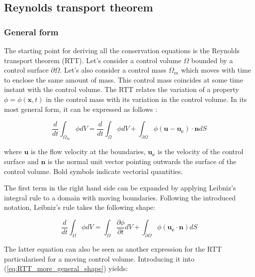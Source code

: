 \subsection{Reynolds transport theorem}

\subsubsection*{General form}

The starting point for deriving all the conservation equations is the Reynolds transport theorem (RTT). Let's consider a control volume $\Omega$ bounded by a control surface $\partial \Omega$. Let's also consider a control mass $\Omega_m$ which moves with time to enclose the same amount of mass. This control mass coincides at some time instant with the control volume. The RTT relates the variation of a property $\phi = \phi \left( \boldsymbol{x}, t \right)$ in the control mass with its variation in the control volume. In its most general form, it can be expressed as follows :

\begin{equation}
\label{eq:RTT_more_general_shape}
\frac{d}{dt} \int_{\Omega_m} \phi  dV =  \frac{ d}{dt} \int_\Omega \phi dV + \int_{\partial \Omega} \phi  \left( \boldsymbol{u} - \boldsymbol{u_c} \right) \cdot \boldsymbol{n}  dS
\end{equation}

where $\boldsymbol{u}$ is the flow velocity at the boundaries, $\boldsymbol{u_c}$ is the velocity of the control surface and $\boldsymbol{n}$ is the normal unit vector pointing outwards the surface of the control volume. Bold symbols indicate vectorial quantities. 

The first term in the right hand side can be expanded by applying Leibniz's integral rule to a domain with moving boundaries. Following the introduced notation, Leibniz's rule takes the following shape:

\begin{equation}
\label{eq:reynolds_transport_theorem_general_controlVolume}
\frac{d}{dt} \int_\Omega \phi dV =  \int_\Omega \frac{\partial \phi}{\partial t} dV + \int_{\partial \Omega} \phi \left( \boldsymbol{u_c} \cdot \boldsymbol{n} \right) dS
\end{equation}

The latter equation can also be seen as another expression for the RTT particularised for a moving control volume. Introducing it into (\ref{eq:RTT_more_general_shape}) yields:


